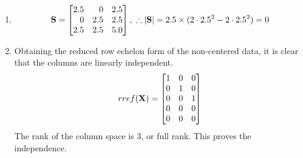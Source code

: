 \begin{enumerate}
	\item 
		$$
		\mf{S} = \m{2.5 & 0 & 2.5 \\ 0 & 2.5 & 2.5 \\ 2.5 & 2.5 & 5.0},\ \therefore |\mf{S}| = 2.5 \times (2 \cdot 2.5^2 - 2 \cdot 2.5^2) = 0
		$$

	\item Obtaining the reduced row echelon form of the non-centered data, it is clear that the columns are linearly independent.
		$$
		rref(\mf{X}) = \m{1 & 0 & 0 \\ 0 & 1 & 0 \\ 0 & 0 & 1 \\ 0 & 0 & 0 \\ 0 & 0 & 0}
		$$
		The rank of the column space is $3$, or full rank. This proves the independence.
\end{enumerate}

\newpage
